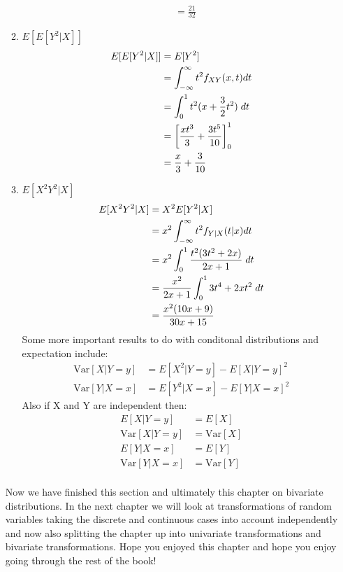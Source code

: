 \documentclass[,oneside]{article}
\begin{document}
\begin{enumerate}
\begin{enumerate}
\begin{align*}
&= \frac{21}{32}
\end{align*}
\item $E[E[Y^2|X]]$
\begin{align*}
E[E[Y^2|X]]&=E[Y^2]\\
&= \int_{-\infty}^{\infty}  t^2 f_{XY}(x,t)dt\\
&= \int_{0}^{1} t^2( x+\frac{3}{2}t^2)\hspace{0.1cm}dt\\
&= \left [ \frac{xt^3}{3} + \frac{3t^5}{10}\right ]_{0}^{1}\\
&= \frac{x}{3}+\frac{3}{10}
\end{align*}
\item $E[X^2 Y^2|X]$
\begin{align*}
E[X^2 Y^2 |X]&=X^2E[Y^2 |X]\\
&=x^2 \int_{-\infty}^{\infty} t^2 f_{Y|X}(t|x)dt\\
&= x^2 \int_{0}^{1} \frac{t^2(3t^2+2x)}{2x+1}\hspace{0.1cm}dt\\
&= \frac{x^2}{2x+1} \int_{0}^{1} 3t^4+2xt^2 \hspace{0.1cm}dt\\
&= \frac{x^2(10x+9)}{30x+15}
\end{align*}
Some more important results to do with conditonal distributions and expectation include:
\begin{align*}
\text{Var}[X | Y=y] &= E[X^2 | Y=y] - E[X | Y=y]^2\\
\text{Var}[Y | X=x] &= E[Y^2 | X=x] - E[Y | X=x]^2
\end{align*}
Also if X and Y are independent then:
\begin{align*}
E[X|Y =y]&=E[X] \\
\text{Var}[X|Y =y]&=\text{Var}[X]\\
E [Y | X = x] &= E[Y]\\
\text{Var}[Y | X = x] &= \text{Var}[Y]\\
\end{align*}
\end{enumerate}
Now we have finished this section and ultimately this chapter on bivariate distributions. In the next chapter we will look at transformations of random variables taking the discrete and continuous cases into account independently and now also splitting the chapter up into univariate transformations and bivariate transformations. Hope you enjoyed this chapter and hope you enjoy going through the rest of the book!
\pagebreak  

\end{enumerate}
\end{document}
